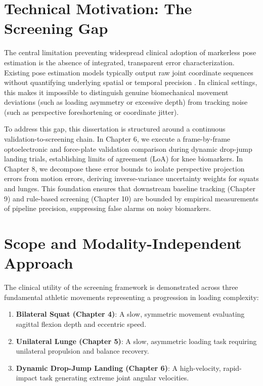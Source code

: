 \section{Technical Motivation: The Screening Gap}
\label{sec:1-1-technical-motivation-the-screening-gap}


The central limitation preventing widespread clinical adoption of markerless pose estimation is the absence of integrated, transparent error characterization. Existing pose estimation models typically output raw joint coordinate sequences without quantifying underlying spatial or temporal precision \citep{MP_2020}. In clinical settings, this makes it impossible to distinguish genuine biomechanical movement deviations (such as loading asymmetry or excessive depth) from tracking noise (such as perspective foreshortening or coordinate jitter).

To address this gap, this dissertation is structured around a continuous validation-to-screening chain. In Chapter 6, we execute a frame-by-frame optoelectronic and force-plate validation comparison during dynamic drop-jump landing trials, establishing limits of agreement (LoA) for knee biomarkers. In Chapter 8, we decompose these error bounds to isolate perspective projection errors from motion errors, deriving inverse-variance uncertainty weights for squats and lunges. This foundation ensures that downstream baseline tracking (Chapter 9) and rule-based screening (Chapter 10) are bounded by empirical measurements of pipeline precision, suppressing false alarms on noisy biomarkers.



\section{Scope and Modality-Independent Approach}
\label{sec:1-2-scope-and-modality-independent-approach}


The clinical utility of the screening framework is demonstrated across three fundamental athletic movements representing a progression in loading complexity:
\begin{enumerate}
  \item \textbf{Bilateral Squat (Chapter 4)}: A slow, symmetric movement evaluating sagittal flexion depth and eccentric speed.
  \item \textbf{Unilateral Lunge (Chapter 5)}: A slow, asymmetric loading task requiring unilateral propulsion and balance recovery.
  \item \textbf{Dynamic Drop-Jump Landing (Chapter 6)}: A high-velocity, rapid-impact task generating extreme joint angular velocities.
\end{enumerate}

